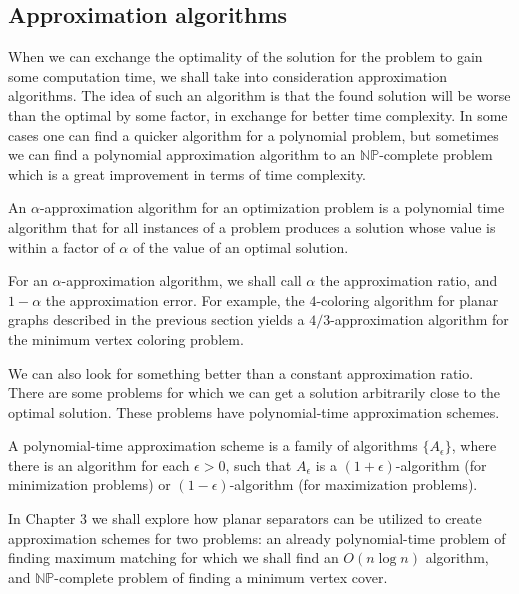\subsection{Approximation algorithms}
When we can exchange the optimality of the solution for the problem to gain some computation time, we shall take into 
consideration approximation algorithms. The idea of such an algorithm is that the found solution will be worse than the optimal 
by some factor, in exchange for better time complexity. In some cases one can find a quicker algorithm for a polynomial problem, but 
sometimes we can find a polynomial approximation algorithm to an $\mathbb{N}\mathbb{P}$-complete problem which is a great improvement in terms of time 
complexity.

\begin{defn} \cite{williamson2011design} \label{defn:opt-problem}
    An $\alpha$-approximation algorithm for an optimization problem is a polynomial time algorithm that for all instances of a problem 
    produces a solution whose value is within a factor of $\alpha$ of the value of an optimal solution.
\end{defn}

For an $\alpha$-approximation algorithm, we shall call $\alpha$ the approximation ratio, and $1 - \alpha$ the approximation error.
For example, the $4$-coloring algorithm for planar graphs described in the previous section yields a $4/3$-approximation algorithm for the minimum vertex coloring problem.

We can also look for something better than a constant approximation ratio. There are some problems for which we can get a solution 
arbitrarily close to the optimal solution. These problems have polynomial-time approximation schemes.

\begin{defn}
    A polynomial-time approximation scheme is a family of algorithms $\{A_{\epsilon}\}$, where there is an algorithm for each $\epsilon > 0$,
    such that $A_{\epsilon}$ is a $(1 + \epsilon)$-algorithm (for minimization problems) or $(1 - \epsilon)$-algorithm (for maximization problems).
\end{defn}

In Chapter 3 we shall explore how planar separators can be utilized to create approximation schemes for two problems: an already polynomial-time 
problem of finding maximum matching for which we shall find an $O(n \log n)$ algorithm, and $\mathbb{N}\mathbb{P}$-complete problem of finding a minimum vertex cover.
